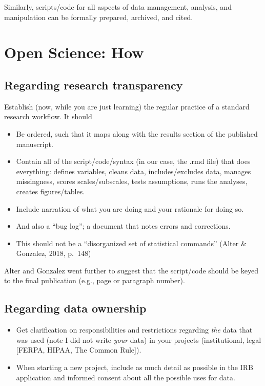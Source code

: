 \documentclass[
  english,
]{book}
\providecommand{\tightlist}{%
  \setlength{\itemsep}{0pt}\setlength{\parskip}{0pt}}
\begin{document}
Similarly, scripts/code for all aspects of data management, analysis, and manipulation can be formally prepared, archived, and cited.

\hypertarget{open-science-how}{%
\section{Open Science: How}\label{open-science-how}}

\hypertarget{regarding-research-transparency}{%
\subsection{Regarding research transparency}\label{regarding-research-transparency}}

Establish (now, while you are just learning) the regular practice of a standard research workflow. It should

\begin{itemize}
\tightlist
\item
  Be ordered, such that it maps along with the results section of the published manuscript.
\item
  Contain all of the script/code/syntax (in our case, the .rmd file) that does everything: defines variables, cleans data, includes/excludes data, manages missingness, scores scales/subscales, tests assumptions, runs the analyses, creates figures/tables.
\item
  Include narration of what you are doing and your rationale for doing so.
\item
  And also a ``bug log''; a document that notes errors and corrections.
\item
  This should not be a ``disorganized set of statistical commands'' (Alter \& Gonzalez, 2018, p.~148)
\end{itemize}

Alter and Gonzalez \citeyearpar{alter_responsible_2018} went further to suggest that the script/code should be keyed to the final publication (e.g., page or paragraph number).

\hypertarget{regarding-data-ownership}{%
\subsection{Regarding data ownership}\label{regarding-data-ownership}}

\begin{itemize}
\tightlist
\item
  Get clarification on responsibilities and restrictions regarding \emph{the} data that was used (note I did not write \emph{your} data) in your projects (institutional, legal {[}FERPA, HIPAA, The Common Rule{]}).
\item
  When starting a new project, include as much detail as possible in the IRB application and informed consent about all the possible uses for data.
\end{itemize}
\end{document}
